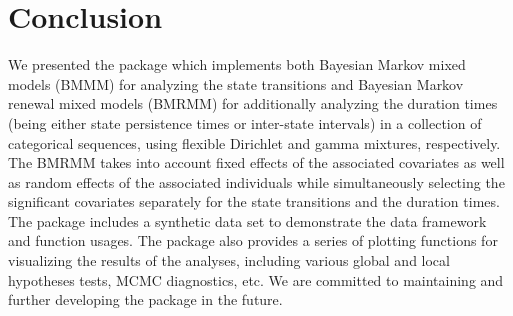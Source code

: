 \section{Conclusion} \label{sec:end}

We presented the  package which implements 
both Bayesian Markov mixed models (BMMM) for analyzing the state transitions 
and Bayesian Markov renewal mixed models (BMRMM) for additionally analyzing the duration times (being either state persistence times or inter-state intervals)
in a collection of categorical sequences, 
using flexible Dirichlet and gamma mixtures, respectively. 
The BMRMM takes into account fixed effects of the associated covariates as well as random effects of the associated individuals while
simultaneously selecting the significant covariates separately for the state transitions and the {duration times}. 
{The package includes a synthetic  data set to demonstrate the data framework and function usages.} 
The package also provides a series of plotting functions for visualizing the results of the analyses, 
including various global and local hypotheses tests, MCMC diagnostics, etc. 
We are committed to maintaining and further developing the package in the future. 









\address{Yutong Wu\\
  Department of Mechanical Engineering\\
  The University of Texas at Austin\\
  204 E Dean Keeton St C2200, Austin, TX 78712-1591\\
 United States\\
  ORCID: 0000-0001-7828-9981\\
  }

\address{Abhra Sarkar\\
   Department of Statistics and Data Sciences\\
  The University of Texas at Austin\\
  2317 Speedway D9800, Austin, TX 78712-1823\\
  United States\\
  ORCID: 0000-0002-6924-8464\\
  }

